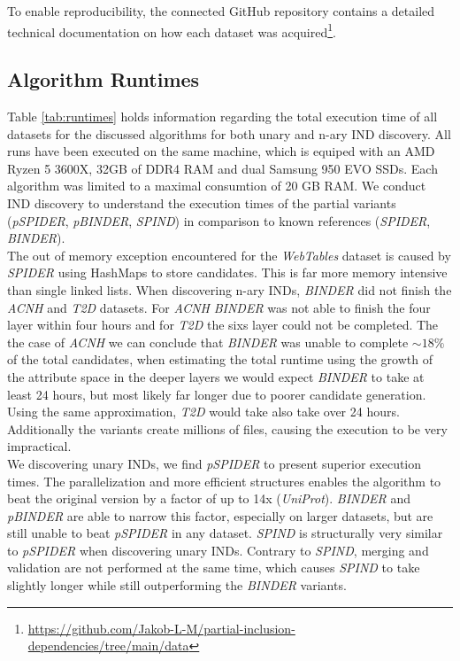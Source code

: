To enable reproducibility, the connected GitHub repository contains a detailed technical documentation on how each dataset was acquired\footnote{\url{https://github.com/Jakob-L-M/partial-inclusion-dependencies/tree/main/data}}.

\subsection{Algorithm Runtimes} Table \ref{tab:runtimes} holds information regarding the total execution time of all datasets for the discussed algorithms for both unary and n-ary IND discovery. All runs have been executed on the same machine, which is equiped with an AMD Ryzen 5 3600X, 32GB of DDR4 RAM and dual Samsung 950 EVO SSDs. Each algorithm was limited to a maximal consumtion of 20 GB RAM. We conduct IND discovery to understand the execution times of the partial variants (\textit{pSPIDER}, \textit{pBINDER}, \textit{SPIND}) in comparison to known references (\textit{SPIDER}, \textit{BINDER}). \\
The out of memory exception encountered for the \textit{WebTables} dataset is caused by \textit{SPIDER} using HashMaps to store candidates. This is far more memory intensive than single linked lists.
When discovering n-ary INDs, \textit{BINDER} did not finish the \textit{ACNH} and \textit{T2D} datasets. For \textit{ACNH} \textit{BINDER} was not able to finish the four layer within four hours and for \textit{T2D} the sixs layer could not be completed. The the case of \textit{ACNH} we can conclude that \textit{BINDER} was unable to complete $\sim 18\%$ of the total candidates, when estimating the total runtime using the growth of the attribute space in the deeper layers we would expect \textit{BINDER} to take at least 24 hours, but most likely far longer due to poorer candidate generation. Using the same approximation, \textit{T2D} would take also take over 24 hours. Additionally the variants create millions of files, causing the execution to be very impractical. \\


We discovering unary INDs, we find \textit{pSPIDER} to present superior execution times. The parallelization and more efficient structures enables the algorithm to beat the original version by a factor of up to 14x (\textit{UniProt}). \textit{BINDER} and \textit{pBINDER} are able to narrow this factor, especially on larger datasets, but are still unable to beat \textit{pSPIDER} in any dataset. \textit{SPIND} is structurally very similar to \textit{pSPIDER} when discovering unary INDs. Contrary to \textit{SPIND}, merging and validation are not performed at the same time, which causes \textit{SPIND} to take slightly longer while still outperforming the \textit{BINDER} variants.


